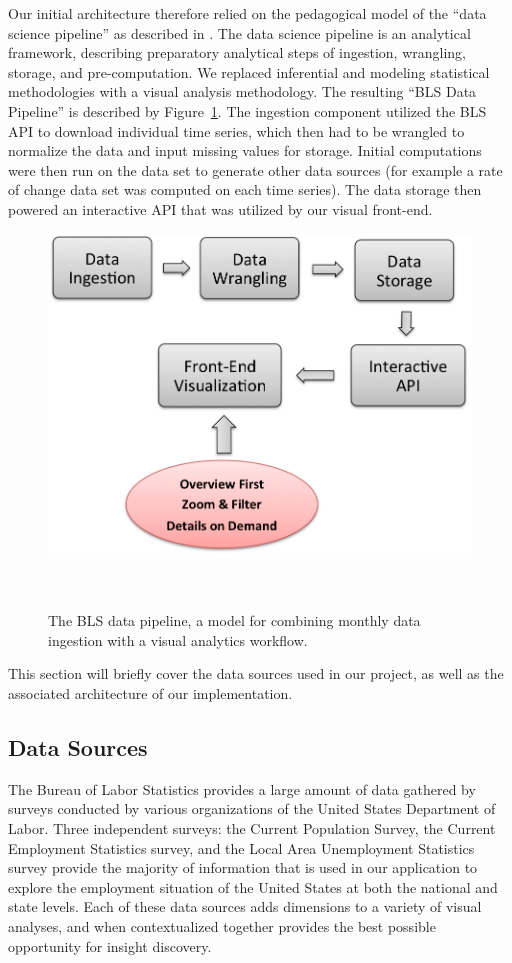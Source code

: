 \documentclass{sigchi}
\begin{document}
Our initial architecture therefore relied on the pedagogical model of the ``data science pipeline'' as described in \cite{ojeda_practical_2014}. The data science pipeline is an analytical framework, describing preparatory analytical steps of ingestion, wrangling, storage, and pre-computation. We replaced inferential and modeling statistical methodologies with a visual analysis methodology. The resulting ``BLS Data Pipeline'' is described by Figure~\ref{fig:pipline}. The ingestion component utilized the BLS API to download individual time series, which then had to be wrangled to normalize the data and input missing values for storage. Initial computations were then run on the data set to generate other data sources (for example a rate of change data set was computed on each time series). The data storage then powered an interactive API that was utilized by our visual front-end.

\begin{figure}[!h]
    \centering
    \includegraphics[width=0.9\columnwidth]{figures/pipeline.png}
    \caption{The BLS data pipeline, a model for combining monthly data ingestion with a visual analytics workflow.}~\label{fig:pipline}
\end{figure}

This section will briefly cover the data sources used in our project, as well as the associated architecture of our implementation.

\subsection{Data Sources}

The Bureau of Labor Statistics provides a large amount of data gathered by surveys conducted by various organizations of the United States Department of Labor. Three independent surveys: the Current Population Survey, the Current Employment Statistics survey, and the Local Area Unemployment Statistics survey provide the majority of information that is used in our application to explore the employment situation of the United States at both the national and state levels. Each of these data sources adds dimensions to a variety of visual analyses, and when contextualized together provides the best possible opportunity for insight discovery.
\end{document}

